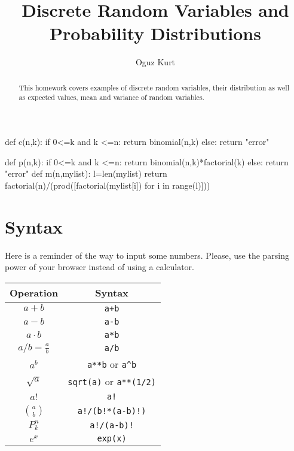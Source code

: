 \documentclass{ximera}
\title{Discrete Random Variables and Probability Distributions}
\author{Oguz Kurt}
\begin{document}
\begin{abstract}
This homework covers examples of discrete random variables, their distribution as well as expected values, mean and variance of random variables.
\end{abstract}
\maketitle

\begin{sagesilent}
def c(n,k):
    if 0<=k and k <=n:
        return binomial(n,k)
    else:
        return "error"

def p(n,k):
    if 0<=k and k <=n:
        return binomial(n,k)*factorial(k)
    else:
        return "error"
def m(n,mylist):
    l=len(mylist)
    return factorial(n)/(prod([factorial(mylist[i]) for i in range(l)]))
\end{sagesilent}

\section*{Syntax}
Here is a reminder of the way to input some numbers. Please, use the parsing power of your browser instead of using a calculator.

\hspace{0.5cm}


\begin{tabular}{c|c}
Operation & Syntax  
\\
\hline
$a+b$ & {\color{red} \verb!a+b!} 
\\
\hline
$a- b$ & {\color{red} \verb!a-b!} 
\\
\hline
$a\cdot b$ & {\color{red} \verb!a*b! } 
\\
\hline
$a/b=\frac{a}{b}$ & {\color{red} \verb!a/b!}
\\
\hline
$a^b$ & {\color{red} \verb|a**b| or \verb|a^b|} 
\\
\hline
$\sqrt{a}$ & {\color{red} \verb|sqrt(a)| or \verb|a**(1/2)|} 
\\
\hline
$a!$ & {\color{red} \verb|a!|} 
\\
\hline
$\binom{a}{b}$ & {\color{red} \verb|a!/(b!*(a-b)!)|}
\\
\hline
$P_k^n$ & {\color{red} \verb|a!/(a-b)!|}
\\
\hline
$e^x$ & {\color{red} \verb|exp(x)|}
\\
\end{tabular}

\hspace{1cm}
\end{document}
